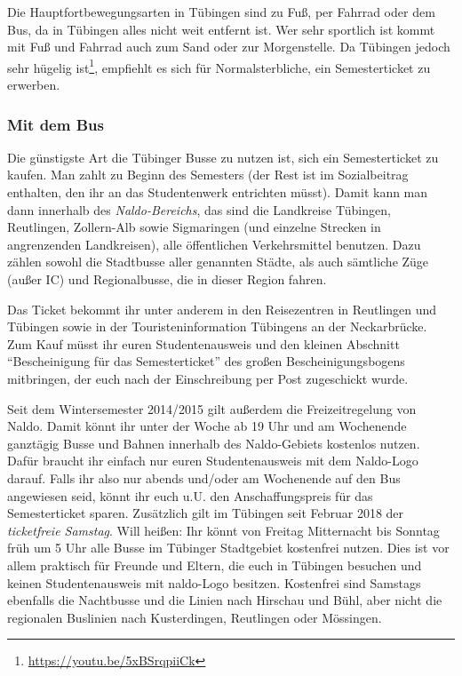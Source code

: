 Die Hauptfortbewegungsarten in Tübingen sind zu Fuß, per Fahrrad oder dem Bus, da in Tübingen alles nicht weit entfernt ist. Wer sehr sportlich ist kommt mit Fuß und Fahrrad auch zum Sand oder zur Morgenstelle. Da Tübingen jedoch sehr hügelig ist\footnote{\url{https://youtu.be/5xBSrqpiiCk}}, empfiehlt es sich für Normalsterbliche, ein Semesterticket zu erwerben.	%
\vfill \pagebreak
\subsubsection*{Mit dem Bus}
Die günstigste Art die Tübinger Busse zu nutzen ist, sich ein Semesterticket zu kaufen. Man zahlt zu Beginn des Semesters \Ticketpreis (der Rest ist im Sozialbeitrag enthalten, den ihr an das Studentenwerk entrichten müsst).  Damit kann man dann innerhalb des \emph{Naldo-Bereichs}, das sind die Landkreise Tübingen, Reutlingen, Zollern-Alb sowie Sigmaringen (und einzelne Strecken in angrenzenden Landkreisen), alle öffentlichen Verkehrsmittel benutzen. Dazu zählen sowohl die Stadtbusse aller genannten Städte, als auch sämtliche Züge (außer IC) und Regionalbusse, die in dieser Region fahren.

Das Ticket bekommt ihr unter anderem in den Reisezentren in Reutlingen und Tübingen sowie in der Touristeninformation Tübingens an der Neckarbrücke. Zum Kauf müsst ihr euren Studentenausweis und den kleinen Abschnitt "`Bescheinigung für das Semesterticket"' des großen Bescheinigungsbogens mitbringen, der euch nach der Einschreibung per Post zugeschickt wurde.

Seit dem Wintersemester 2014/2015 gilt außerdem die Freizeitregelung von Naldo. Damit könnt ihr unter der Woche ab 19 Uhr und am Wochenende ganztägig Busse und Bahnen innerhalb des Naldo-Gebiets kostenlos nutzen. Dafür braucht ihr einfach nur euren Studentenausweis mit dem Naldo-Logo darauf. Falls ihr also nur abends und/oder am Wochenende auf den Bus angewiesen seid, könnt ihr euch u.U. den Anschaffungspreis für das Semesterticket sparen.
Zusätzlich gilt im Tübingen seit Februar 2018 der \emph{ticketfreie Samstag}. Will heißen: Ihr könnt von Freitag Mitternacht bis Sonntag früh um 5 Uhr alle Busse im Tübinger Stadtgebiet kostenfrei nutzen. Dies ist vor allem praktisch für Freunde und Eltern, die euch in Tübingen besuchen und keinen Studentenausweis mit naldo-Logo besitzen. Kostenfrei sind Samstags ebenfalls die Nachtbusse und die Linien nach Hirschau und Bühl, aber nicht die regionalen Buslinien nach Kusterdingen, Reutlingen oder Mössingen. 

